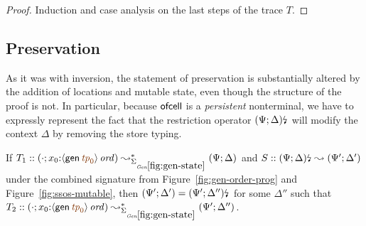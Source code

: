 \begin{proof}
Induction and case analysis on the last steps of the trace $T$. 
\end{proof}





\subsection{Preservation}

As it was with inversion, the statement of preservation is
substantially altered by the addition of locations and mutable state,
even though the structure of the proof is not.  In particular, because
${\sf ofcell}$ is a {\it persistent} nonterminal, we have to expressly
represent the fact that the restriction operator ${(\Psi;
  \Delta)}{\mbox{\lightning}}_{}$ will modify the context $\Delta$ by removing the store
typing.

\bigskip
\begin{theorem}
\label{thm:siggenstate}
If $T_1 :: (\cdot; x_0{:}\istrue{\susp{{\sf gen}\,\lf{{\it tp}_0}}}) 
   \leadsto^*_{\siggenstate} 
   (\Psi; \Delta)$ and 
   $S :: {(\Psi; \Delta)}{\mbox{\lightning}}_{} \leadsto (\Psi'; \Delta')$
under the combined signature from Figure~\ref{fig:gen-order-prog}
and Figure~\ref{fig:ssos-mutable}, then
$(\Psi'; \Delta') = {(\Psi'; \Delta'')}{\mbox{\lightning}}_{}$ 
for some $\Delta''$ such that 
$T_2 :: (\cdot; x_0{:}\istrue{\susp{{\sf gen}\,\lf{{\it tp}_0}}}) 
   \leadsto^*_{\siggenstate} 
   (\Psi'; \Delta'')$.
\end{theorem}

